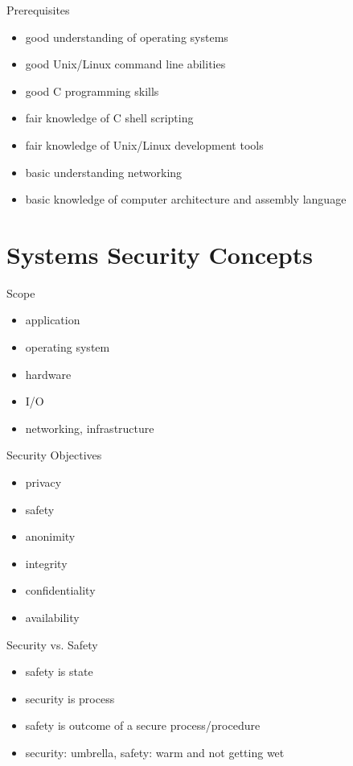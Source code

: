 \documentclass{curs}
\begin{document}
\begin{frame}{Prerequisites}
  \begin{itemize}
    \item good understanding of operating systems
    \item good Unix/Linux command line abilities
    \item good C programming skills
    \item fair knowledge of C shell scripting
    \item fair knowledge of Unix/Linux development tools
    \item basic understanding networking
    \item basic knowledge of computer architecture and assembly language
  \end{itemize}
\end{frame}


\section{Systems Security Concepts}

\begin{frame}{Scope}
  \begin{itemize}
    \item application
    \item operating system
    \item hardware
    \item I/O
    \item networking, infrastructure
  \end{itemize}
\end{frame}

\begin{frame}{Security Objectives}
  \begin{itemize}
    \item privacy
    \item safety
    \item anonimity
    \item integrity
    \item confidentiality
    \item availability
  \end{itemize}
\end{frame}

\begin{frame}{Security vs. Safety}
  \begin{itemize}
    \item safety is state
    \item security is process
    \item safety is outcome of a secure process/procedure
    \item security: umbrella, safety: warm and not getting wet
  \end{itemize}
\end{frame}
\end{document}
